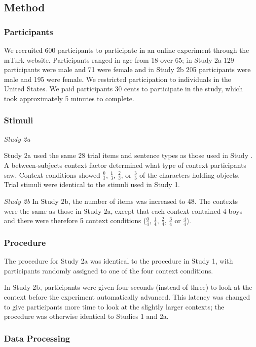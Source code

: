 \documentclass[10pt,letterpaper]{article}
\begin{document}
\subsection{Method}

\subsubsection{Participants } 
We recruited 600 participants to participate in an online experiment through the mTurk website. Participants ranged in age from 18-over 65; in Study 2a 129 participants were male and 71 were female and in Study 2b 205 participants were male and 195 were female.  We restricted participation to individuals in the United States. We paid participants 30 cents to participate in the study, which took approximately 5 minutes to complete.  

\subsubsection{Stimuli}
\emph{Study 2a} 

Study 2a used the same 28 trial items and sentence types as those used in Study .  A between-subjects context factor determined what type of context participants saw.  Context conditions showed $\frac{0}{3}$, $\frac{1}{3}$, $\frac{2}{3}$, or $\frac{3}{3}$ of the characters holding objects.  Trial stimuli were identical to the stimuli used in Study 1.  

\emph{Study 2b}
In Study 2b, the number of items was increased to 48.  The contexts were the same as those in Study 2a, except that each context contained 4 boys and there were therefore 5 context conditions ($\frac{0}{4}$, $\frac{1}{4}$, $\frac{2}{4}$, $\frac{3}{4}$ or $\frac{4}{4}$).  

\subsubsection{Procedure}
 The procedure for Study 2a was identical to the procedure in Study 1, with participants randomly assigned to one of the four context conditions.  
 
 In Study 2b, participants were given four seconds (instead of three) to look at the context before the experiment automatically advanced.  This latency was changed to give participants more time to look at the slightly larger contexts; the procedure was otherwise identical to Studies 1 and 2a.  
 
 \subsubsection{Data Processing}
\end{document}

